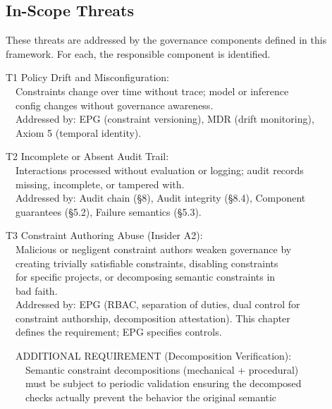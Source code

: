 \subsection{In-Scope Threats}


These threats are addressed by the governance components defined in this framework. For each, the responsible component is identified.

\begin{claddisp}
T1 \textemdash{} Policy Drift and Misconfiguration:\\
~~Constraints change over time without trace; model or inference\\
~~config changes without governance awareness.\\
~~Addressed by: EPG (constraint versioning), MDR (drift monitoring),\\
~~Axiom 5 (temporal identity).
\par\smallskip
T2 \textemdash{} Incomplete or Absent Audit Trail:\\
~~Interactions processed without evaluation or logging; audit records\\
~~missing, incomplete, or tampered with.\\
~~Addressed by: Audit chain (\S{}8), Audit integrity (\S{}8.4), Component\\
~~guarantees (\S{}5.2), Failure semantics (\S{}5.3).
\par\smallskip
T3 \textemdash{} Constraint Authoring Abuse (Insider \textemdash{} A2):\\
~~Malicious or negligent constraint authors weaken governance by\\
~~creating trivially satisfiable constraints, disabling constraints\\
~~for specific projects, or decomposing semantic constraints in\\
~~bad faith.\\
~~Addressed by: EPG (RBAC, separation of duties, dual control for\\
~~constraint authorship, decomposition attestation). This chapter\\
~~defines the requirement; EPG specifies controls.
\par\smallskip
~~ADDITIONAL REQUIREMENT (Decomposition Verification):\\
~~~~Semantic constraint decompositions (mechanical + procedural)\\
~~~~must be subject to periodic validation ensuring the decomposed\\
~~~~checks actually prevent the behavior the original semantic\\

\end{claddisp}
